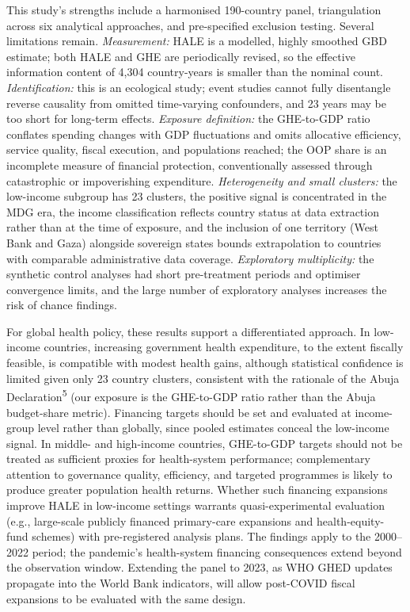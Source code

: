 \documentclass[12pt,a4paper]{article}
\begin{document}
This study's strengths include a harmonised 190-country panel, triangulation across six analytical approaches, and pre-specified exclusion testing. Several limitations remain. \textit{Measurement:} HALE is a modelled, highly smoothed GBD estimate; both HALE and GHE are periodically revised, so the effective information content of 4,304 country-years is smaller than the nominal count. \textit{Identification:} this is an ecological study; event studies cannot fully disentangle reverse causality from omitted time-varying confounders, and 23 years may be too short for long-term effects. \textit{Exposure definition:} the GHE-to-GDP ratio conflates spending changes with GDP fluctuations and omits allocative efficiency, service quality, fiscal execution, and populations reached; the OOP share is an incomplete measure of financial protection, conventionally assessed through catastrophic or impoverishing expenditure. \textit{Heterogeneity and small clusters:} the low-income subgroup has 23 clusters, the positive signal is concentrated in the MDG era, the income classification reflects country status at data extraction rather than at the time of exposure, and the inclusion of one territory (West Bank and Gaza) alongside sovereign states bounds extrapolation to countries with comparable administrative data coverage. \textit{Exploratory multiplicity:} the synthetic control analyses had short pre-treatment periods and optimiser convergence limits, and the large number of exploratory analyses increases the risk of chance findings.

For global health policy, these results support a differentiated approach. In low-income countries, increasing government health expenditure, to the extent fiscally feasible, is compatible with modest health gains, although statistical confidence is limited given only 23 country clusters, consistent with the rationale of the Abuja Declaration\textsuperscript{5} (our exposure is the GHE-to-GDP ratio rather than the Abuja budget-share metric). Financing targets should be set and evaluated at income-group level rather than globally, since pooled estimates conceal the low-income signal. In middle- and high-income countries, GHE-to-GDP targets should not be treated as sufficient proxies for health-system performance; complementary attention to governance quality, efficiency, and targeted programmes is likely to produce greater population health returns. Whether such financing expansions improve HALE in low-income settings warrants quasi-experimental evaluation (e.g., large-scale publicly financed primary-care expansions and health-equity-fund schemes) with pre-registered analysis plans. The findings apply to the 2000--2022 period; the pandemic's health-system financing consequences extend beyond the observation window. Extending the panel to 2023, as WHO GHED updates propagate into the World Bank indicators, will allow post-COVID fiscal expansions to be evaluated with the same design.
\end{document}
